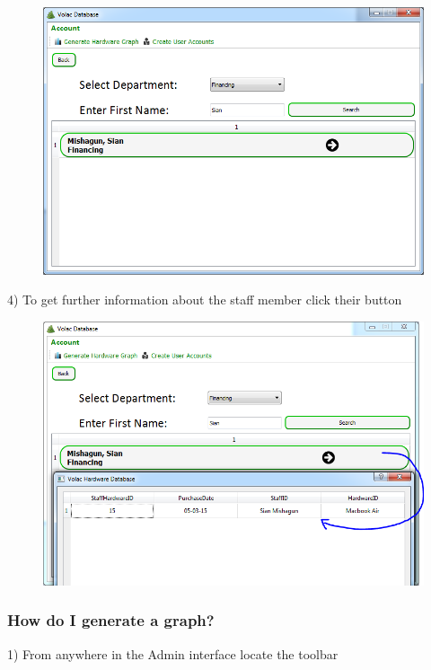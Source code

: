 \begin{figure}[H]
    \includegraphics[width=\textwidth]{./Manual/Images/searchdep3.png}
\end{figure}

4) To get further information about the staff member click their button

\begin{figure}[H]
    \includegraphics[width=\textwidth]{./Manual/Images/searchdep4.png}
\end{figure}

\subsubsection{How do I generate a graph?}\label{graph}

1) From anywhere in the Admin interface locate the toolbar

